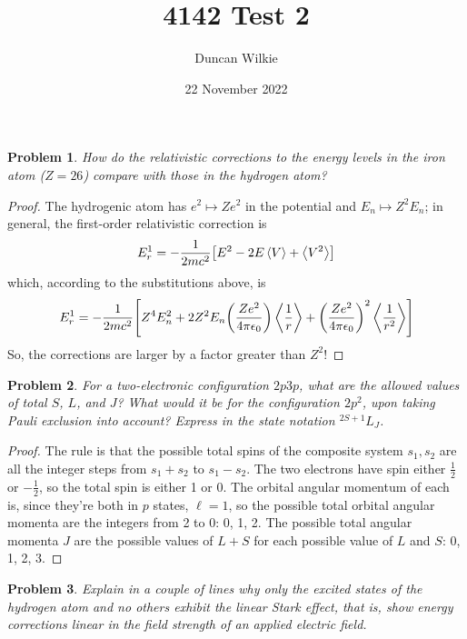 \documentclass{article}
\title{4142 Test 2}
\author{Duncan Wilkie}
\date{22 November 2022}
\newtheorem{plm}{Problem}
\begin{document}
\maketitle

\begin{plm}
  How do the relativistic corrections to the energy levels in the iron atom ($Z = 26$) compare with those in the hydrogen atom?
\end{plm}

\begin{proof}
  The hydrogenic atom has $e^{2} \mapsto Ze^{2}$ in the potential and $E_{n} \mapsto Z^{2}E_{n}$; in general,
  the first-order relativistic correction is
  \[
    E_{r}^{1} = -\frac{1}{2mc^{2}}\qty[E^{2} - 2E\expval{V} + \expval{V^{2}}]
  \]
  which, according to the substitutions above, is
  \[
    E_{r}^{1} = -\frac{1}{2mc^{2}}\qty[Z^{4}E_{n}^{2} + 2Z^{2}E_{n}\qty(\frac{Ze^{2}}{4\pi\epsilon_{0}})\expval{\frac{1}{r}}
    + \qty(\frac{Ze^{2}}{4\pi\epsilon_{0}})^{2}\expval{\frac{1}{r^{2}}}]
  \]
  So, the corrections are larger by a factor greater than $Z^{2}$!
\end{proof}

\begin{plm}
  For a two-electronic configuration $2p3p$, what are the allowed values of total $S$, $L$, and $J$?
  What would it be for the configuration $2p^{2}$, upon taking Pauli exclusion into account?
  Express in the state notation ${}^{2S+1}L_{J}$.
\end{plm}

\begin{proof}
  The rule is that the possible total spins of the composite system $s_{1}, s_{2}$ are all the integer steps from $s_{1} + s_{2}$ to $s_{1} - s_{2}$.
  The two electrons have spin either $\frac{1}{2}$ or $-\frac{1}{2}$, so the total spin is either 1 or 0.
  The orbital angular momentum of each is, since they're both in $p$ states, $\ell = 1$, so the possible total orbital angular momenta
  are the integers from 2 to 0: 0, 1, 2.
  The possible total angular momenta $J$ are the possible values of $L + S$ for each possible value of $L$ and $S$: 0, 1, 2, 3.
\end{proof}

\begin{plm}
  Explain in a couple of lines why only the excited states of the hydrogen atom and no others exhibit the linear Stark effect, that is,
  show energy corrections linear in the field strength of an applied electric field.
\end{plm}
\end{document}
